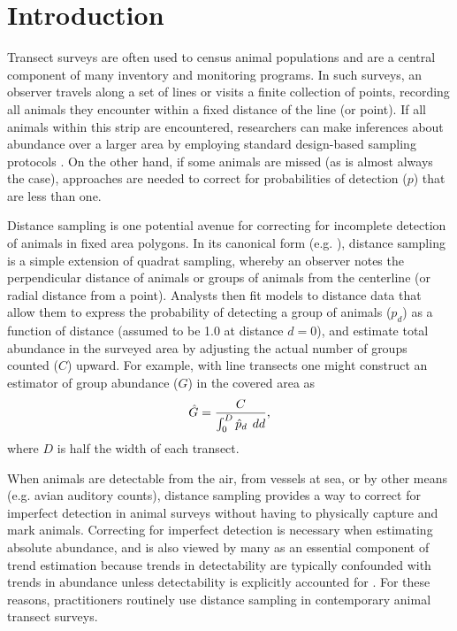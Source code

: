 \documentclass[10pt]{article}
\begin{document}

\section*{Introduction}

Transect surveys are often used to census animal populations and are a central component of many inventory and monitoring programs.  In such surveys, an observer travels along a set of lines or visits a finite collection of points, recording all animals they encounter within a fixed distance of the line (or point).  If all animals within this strip are encountered, researchers can make inferences about abundance over a larger area by employing standard design-based sampling protocols \cite{Cochran1977}.  On the other hand, if some animals are missed (as is almost always the case), approaches are needed to correct for probabilities of detection ($p$) that are less than one.

Distance sampling is one potential avenue for correcting for incomplete detection of animals in fixed area polygons.  In its canonical form (e.g. \cite{BurnhamEtAl1980,BucklandEtAl2001}), distance sampling is a simple extension of quadrat sampling, whereby an observer notes the perpendicular distance of animals or groups of animals from the centerline (or radial distance from a point).  Analysts then fit models to distance data that allow them to express the probability of detecting a group of animals ($p_d$) as a function of distance (assumed to be 1.0 at distance $d=0$), and estimate total abundance in the surveyed area by adjusting the actual number of groups counted ($C$) upward.  For example, with line transects one might construct an estimator of group abundance ($G$) in the covered area as
$$
\hat{G} = \frac{C}{\int_0^D \hat{p}_d \hspace{1.5mm}dd},
$$
where $D$ is half the width of each transect.

When animals are detectable from the air, from vessels at sea, or by other means (e.g. avian auditory counts), distance sampling provides a way to correct for imperfect detection in animal surveys without having to physically capture and mark animals.  Correcting for imperfect detection is necessary when estimating absolute abundance, and is also viewed by many as an essential component of trend estimation because trends in detectability are typically confounded with trends in abundance unless detectability is explicitly accounted for \cite{Buckland2006,NicholsEtAl2009}.  For these reasons, practitioners routinely use distance sampling in contemporary animal transect surveys.
\end{document}
